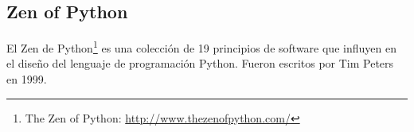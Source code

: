 %
%
%
%
%
%
%
%

\subsection{Zen of Python}

El Zen de Python\footnote{The Zen of Python: \url{http://www.thezenofpython.com/}} es una colección de 19 principios de software que influyen en el diseño del lenguaje de programación Python. Fueron escritos por Tim Peters en 1999.

